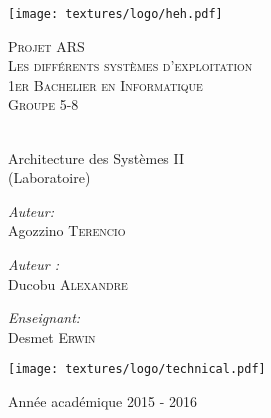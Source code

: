 \begin{center}
  \texttt{[image: textures/logo/heh.pdf]}

  \vspace{2cm}

  \textsc{\LARGE Projet ARS} \\ [0.5cm]
  \textsc{\Large Les différents systèmes d'exploitation} \\ [0.5cm]

  \textsc{\large 1er Bachelier en Informatique} \\ [0.2cm]
  \textsc{Groupe 5-8} \\

  \begingroup
   \selectfont 

  \HRule \\ [0.4cm] {
    \huge Architecture des Systèmes II \\ [0.2cm] 
  }
  (Laboratoire)
  \HRule \\ [1.3cm]
  \endgroup

  \begin{minipage}[t]{0.4 \textwidth} 
    \begin{flushleft} 
      \large \emph{Auteur:} \\ 
      Agozzino \textsc{Terencio} 
    \end{flushleft} 
  \end{minipage}
  \begin{minipage}[t]{0.4 \textwidth}
    \begin{flushright} 
      \large \emph{Auteur :} \\ 
      Ducobu \textsc{Alexandre} 
    \end{flushright} 
  \end{minipage}

  \vspace{0.5cm}

  \begin{minipage}[t]{0.4 \textwidth}
    \begin{center} 
      \large \emph{Enseignant:} \\ 
      Desmet \textsc{Erwin} 
    \end{center} 
  \end{minipage}

  \vspace{0.5cm}

  \texttt{[image: textures/logo/technical.pdf]}

  \vspace{0.5cm}

  Année académique 2015 - 2016
\end{center}

\thispagestyle{empty}
